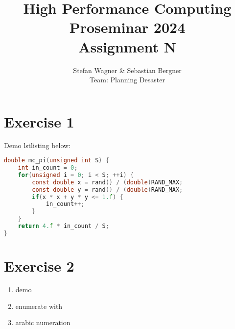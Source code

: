 \documentclass[UTF-8]{article}
\title{High Performance Computing Proseminar 2024 \\
    \large Assignment N} %
\author{Stefan Wagner \& Sebastian Bergner\\Team: Planning Desaster}
\begin{document}
    
    \maketitle
    
    \section*{Exercise 1}
    Demo lstlisting below:
   	\begin{lstlisting}[language=c]
double mc_pi(unsigned int S) {
	int in_count = 0;
	for(unsigned i = 0; i < S; ++i) {
		const double x = rand() / (double)RAND_MAX;
		const double y = rand() / (double)RAND_MAX;
		if(x * x + y * y <= 1.f) {
			in_count++;
		}
	}
	return 4.f * in_count / S;
}\end{lstlisting}
    \section*{Exercise 2}
	
	\begin{enumerate}[label=\textbf{\arabic *)}]
		\item demo
		\item enumerate with 
		\item arabic numeration
	\end{enumerate}
\end{document}

